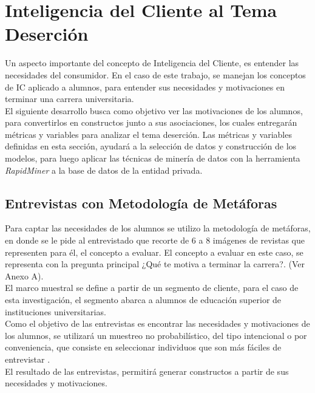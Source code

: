 \chapter[Inteligencia del Cliente al Tema Deserción]{Inteligencia del Cliente al Tema Deserción}
\label{ch:des}


Un aspecto importante del concepto de Inteligencia del Cliente, es entender las necesidades del consumidor. En el caso de este trabajo, se manejan los conceptos de IC aplicado a alumnos, para entender sus necesidades y motivaciones en terminar una carrera universitaria.\\

El siguiente desarrollo busca como objetivo ver las motivaciones de los alumnos, para convertirlos en constructos junto a sus asociaciones, los cuales entregarán métricas y variables para analizar el tema deserción. Las métricas y variables definidas en esta sección, ayudará a la selección de datos y construcción de los modelos, para luego aplicar las técnicas de minería de datos con la herramienta \textit{RapidMiner} a la base de datos de la entidad  privada.

\section{Entrevistas con Metodología de Metáforas}


Para captar las necesidades de los alumnos se utilizo la metodología de metáforas, en donde se le pide al entrevistado que recorte de 6 a 8 imágenes de revistas que representen para él, el concepto a evaluar. El concepto a evaluar en este caso, se representa con la pregunta principal ¿Qué te motiva a terminar la carrera?. (Ver Anexo A).\\

El marco muestral se define a partir de un segmento de cliente, para el caso de esta investigación, el segmento abarca a alumnos de educación superior de instituciones universitarias.\\

Como el objetivo de las entrevistas es encontrar las necesidades y motivaciones de los alumnos, se utilizará un muestreo no probabilístico, del tipo intencional o por conveniencia, que consiste en seleccionar individuos que son más fáciles de entrevistar \cite{muestra}.\\

El resultado de las entrevistas, permitirá generar constructos a partir de sus necesidades y motivaciones.\\



